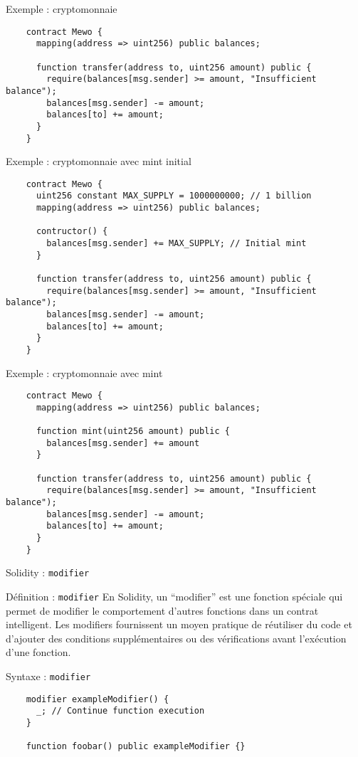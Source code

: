 \begin{frame}[fragile]{Exemple : cryptomonnaie}
  \begin{verbatim}
    contract Mewo {
      mapping(address => uint256) public balances;

      function transfer(address to, uint256 amount) public {
        require(balances[msg.sender] >= amount, "Insufficient balance");
        balances[msg.sender] -= amount;
        balances[to] += amount;
      }
    }
  \end{verbatim}
\end{frame}

\begin{frame}[fragile]{Exemple : cryptomonnaie avec mint initial}
  \begin{verbatim}
    contract Mewo {
      uint256 constant MAX_SUPPLY = 1000000000; // 1 billion
      mapping(address => uint256) public balances;

      contructor() {
        balances[msg.sender] += MAX_SUPPLY; // Initial mint
      }

      function transfer(address to, uint256 amount) public {
        require(balances[msg.sender] >= amount, "Insufficient balance");
        balances[msg.sender] -= amount;
        balances[to] += amount;
      }
    }
  \end{verbatim}
\end{frame}

\begin{frame}[fragile]{Exemple : cryptomonnaie avec mint}
  \begin{verbatim}
    contract Mewo {
      mapping(address => uint256) public balances;

      function mint(uint256 amount) public {
        balances[msg.sender] += amount
      }

      function transfer(address to, uint256 amount) public {
        require(balances[msg.sender] >= amount, "Insufficient balance");
        balances[msg.sender] -= amount;
        balances[to] += amount;
      }
    }
  \end{verbatim}
\end{frame}

\begin{frame}[fragile]{Solidity : \texttt{modifier}}
  \begin{block}{Définition : \texttt{modifier}}
    En Solidity, un \enquote{modifier} est une fonction spéciale qui permet de modifier le comportement d'autres fonctions dans un contrat intelligent.
    Les modifiers fournissent un moyen pratique de réutiliser du code et d'ajouter des conditions supplémentaires ou des vérifications avant l'exécution d'une fonction.
  \end{block}


  \begin{block}{Syntaxe : \texttt{modifier}}
    \begin{verbatim}
    modifier exampleModifier() {
      _; // Continue function execution
    }

    function foobar() public exampleModifier {}
  \end{verbatim}
  \end{block}
\end{frame}

